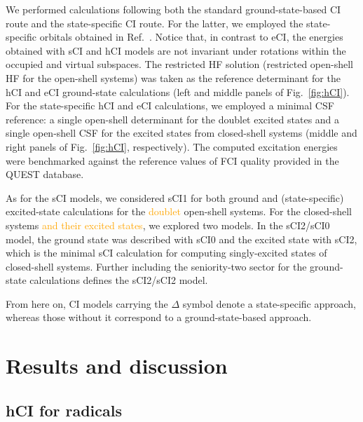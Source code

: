\documentclass[aip,jcp,reprint,noshowkeys,superscriptaddress]{revtex4-1}
\newcommand{\fk}[1]{\textcolor{orange}{#1}}
\begin{document}
We performed calculations following both the standard ground-state-based CI route and the state-specific CI route. \cite{Kossoski_2023}
For the latter, we employed the state-specific orbitals obtained in Ref.~.
Notice that, in contrast to eCI, the energies obtained with sCI and hCI models are not invariant under rotations within the occupied and virtual subspaces.
The restricted HF solution (restricted open-shell HF for the open-shell systems) was taken as the reference determinant for the hCI and eCI ground-state calculations
(left and middle panels of Fig.~\ref{fig:hCI}).
For the state-specific hCI and eCI calculations, we employed a minimal CSF reference: \cite{Kossoski_2023}
a single open-shell determinant for the doublet excited states and a single open-shell CSF for the excited states from closed-shell systems
(middle and right panels of Fig.~\ref{fig:hCI}, respectively).
The computed excitation energies were benchmarked against the reference values of FCI quality provided in the QUEST database. \cite{Veril_2021}

As for the sCI models,
we considered sCI1 for both ground and (state-specific) excited-state calculations for the \fk{doublet} open-shell systems.
For the closed-shell systems \fk{and their excited states}, we explored two models.
In the sCI2/sCI0 model, the ground state was described with sCI0 and the excited state with sCI2, which is the minimal sCI calculation for computing singly-excited states of closed-shell systems.
Further including the seniority-two sector for the ground-state calculations defines the sCI2/sCI2 model.

From here on, CI models carrying the $\Delta$ symbol denote a state-specific approach, whereas those without it correspond to a ground-state-based approach.

\section{Results and discussion}
\label{sec:res}

\subsection{hCI for radicals}
\label{sec:res_A}
\end{document}
